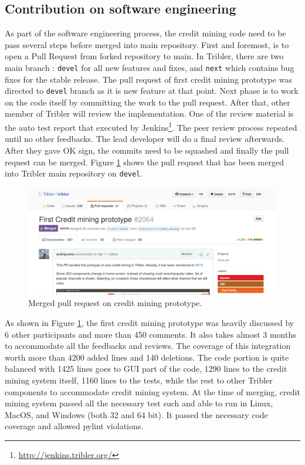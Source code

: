 \subsection{Contribution on software engineering}
As part of the software engineering process, the credit mining code need to be pass several steps before merged into main repository. First and foremost, is to open a Pull Request from forked repository to main. In Tribler, there are two main branch : \texttt{devel} for all new features and fixes, and \texttt{next} which contains bug fixes for the stable release. The pull request of first credit mining prototype was directed to \texttt{devel} branch as it is new feature at that point. Next phase is to work on the code itself by committing the work to the pull request. After that, other member of Tribler will review the implementation. One of the review material is the auto test report that executed by Jenkins\footnote{\url{http://jenkins.tribler.org/}}. The peer review process repeated until no other feedbacks. The lead developer will do a final review afterwards. After they gave OK sign, the commits need to be squashed and finally the pull request can be merged. Figure \ref{fig:cmpullrequest} shows the pull request that has been merged into Tribler main repository on \texttt{devel}.

\begin{figure}[h]
	\centering
	\includegraphics[width=\textwidth]{pics/cm_pr_crop.png}
	\caption[Merged pull request on credit mining prototype]{Merged pull request on credit mining prototype\footnotemark.}
	\label{fig:cmpullrequest}
\end{figure}

As shown in Figure \ref{fig:cmpullrequest}, the first credit mining prototype was heavily discussed by 6 other participants and more than 450 comments. It also takes almost 3 months to accommodate all the feedbacks and reviews. The coverage of this integration worth more than 4200 added lines and 140 deletions. The code portion is quite balanced with 1425 lines goes to GUI part of the code, 1290 lines to the credit mining system itself, 1160 lines to the tests, while the rest to other Tribler components to accommodate credit mining system. At the time of merging, credit mining system passed all the necessary test such and able to run in Linux, MacOS, and Windows (both 32 and 64 bit). It passed the necessary code coverage and allowed pylint violations. 

